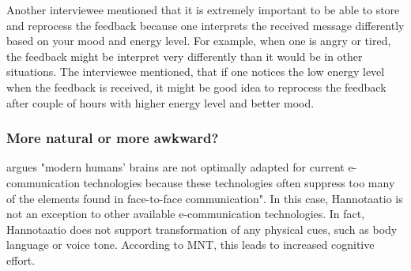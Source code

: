 \documentclass[english,12pt,a4paper,pdftex]{article}
\newcommand{\q}[2]{
\begin{quote}
\emph{(IW #1): #2}
\end{quote}}
\begin{document}
Another interviewee mentioned that it is extremely important to be able to store and reprocess the feedback because one interprets the received message differently based on your mood and energy level. For example, when one is angry or tired, the feedback might be interpret very differently than it would be in other situations. The interviewee mentioned, that if one notices the low energy level when the feedback is received, it might be good idea to reprocess the feedback after couple of hours with higher energy level and better mood.

\subsubsection{More natural or more awkward?}

\citet{kock2005} argues "modern humans' brains are not optimally adapted for current e-communication technologies because these technologies often suppress too many of the elements found in face-to-face communication". In this case, Hannotaatio is not an exception to other available e-communication technologies. In fact, Hannotaatio does not support transformation of any physical cues, such as body language or voice tone. According to \ac{MNT}, this leads to increased cognitive effort.
\end{document}
